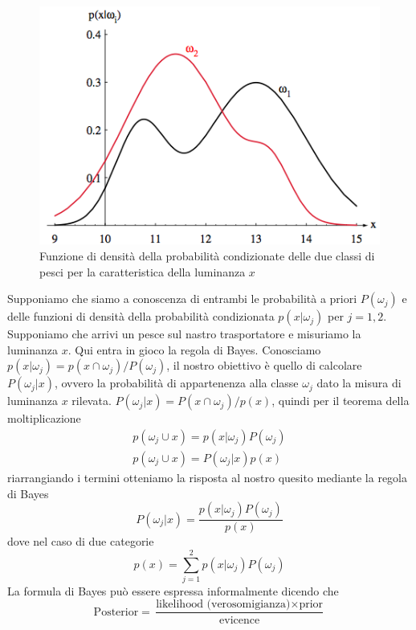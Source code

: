 \begin{figure}
\centering
\includegraphics[scale=0.6]{img/cpdf.png}
\caption{Funzione di densità della probabilità condizionate delle due classi di pesci per la caratteristica della luminanza $x$}
\label{cpdf}
\end{figure}
\noindent Supponiamo che siamo a conoscenza di entrambi le probabilità a priori $P(\omega_j)$ e delle funzioni di densità della probabilità condizionata $p(x|\omega_j)$ per $j = 1,2$. Supponiamo che arrivi un pesce sul nastro trasportatore e misuriamo la luminanza $x$. Qui entra in gioco la regola di Bayes. Conosciamo $p(x|\omega_j) = p(x \cap \omega_j) / P(\omega_j)$, il nostro obiettivo è quello di calcolare $P(\omega_j | x)$, ovvero la probabilità di appartenenza alla classe $\omega_j$ dato la misura di luminanza $x$ rilevata. $P(\omega_j | x) = P(x \cap \omega_j) / p(x)$, quindi per il teorema della moltiplicazione
\begin{gather}
p(\omega_j \cup x) = p(x|\omega_j) P(\omega_j)\\
p(\omega_j \cup x) = P(\omega_j|x ) p(x)
\end{gather}
riarrangiando i termini otteniamo la risposta al nostro quesito mediante la regola di Bayes
\begin{equation}
P(\omega_j|x) = \frac{p(x|\omega_j) P(\omega_j)}{p(x)}
\end{equation}
dove nel caso di due categorie
\begin{equation}
p(x) = \sum_{j=1}^2 p(x|\omega_j) P(\omega_j)
\end{equation}
La formula di Bayes può essere espressa informalmente  dicendo che
\begin{equation}
\text{Posterior} = \frac{\text{likelihood (verosomigianza)} \times \text{prior}}{\text{evicence}}
\end{equation}
